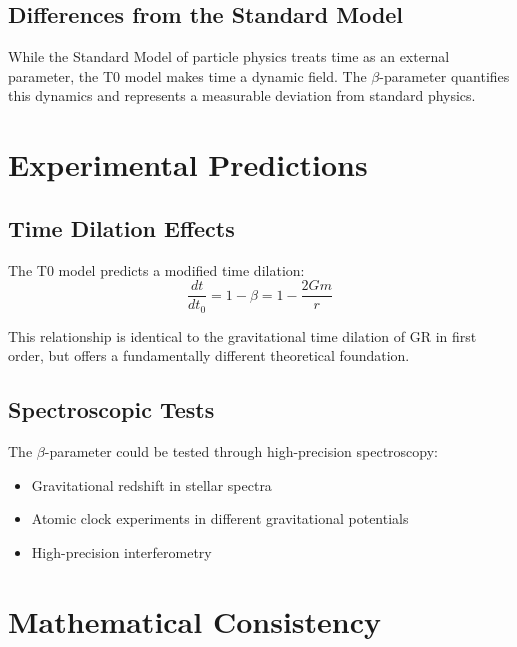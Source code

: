 	\subsection{Differences from the Standard Model}
	\label{subsec:sm_differences}
	
	While the Standard Model of particle physics treats time as an external parameter, the T0 model makes time a dynamic field. The $\beta$-parameter quantifies this dynamics and represents a measurable deviation from standard physics.
	
	\section{Experimental Predictions}
	\label{sec:experimental_predictions}
	
	\subsection{Time Dilation Effects}
	\label{subsec:time_dilation}
	
	The T0 model predicts a modified time dilation:
	\begin{equation}
		\frac{dt}{dt_0} = 1 - \beta = 1 - \frac{2Gm}{r}
	\end{equation}
	
	This relationship is identical to the gravitational time dilation of GR in first order, but offers a fundamentally different theoretical foundation.
	
	\subsection{Spectroscopic Tests}
	\label{subsec:spectroscopic_tests}
	
	The $\beta$-parameter could be tested through high-precision spectroscopy:
	\begin{itemize}
		\item Gravitational redshift in stellar spectra
		\item Atomic clock experiments in different gravitational potentials
		\item High-precision interferometry
	\end{itemize}
	
	\section{Mathematical Consistency}
	\label{sec:mathematical_consistency}
	
